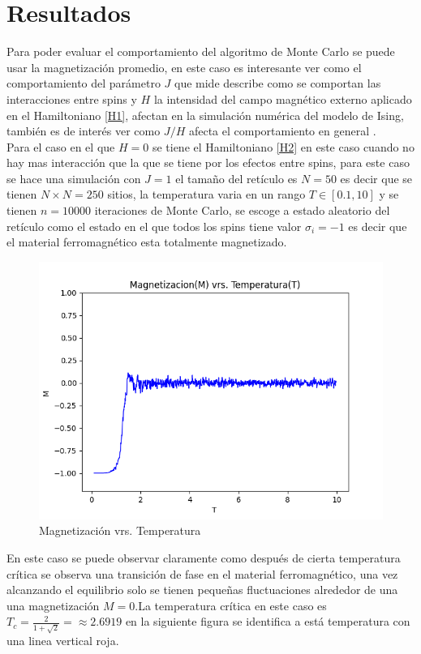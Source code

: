\documentclass[a4paper]{article}
\begin{document}
\section{Resultados}
Para poder evaluar el comportamiento del algoritmo de Monte Carlo se puede usar la magnetización promedio, en este caso es interesante ver como el comportamiento del parámetro $J$ que mide describe como se comportan las interacciones entre spins y $H$ la intensidad del campo magnético externo aplicado en el Hamiltoniano \ref{H1}, afectan en la simulación numérica del modelo de Ising, también es de interés ver como $J/H$ afecta el comportamiento en general .\\
Para el caso en el que $H=0$ se tiene el Hamiltoniano \ref{H2} en este caso cuando no hay mas interacción que la que se tiene por los efectos entre spins, para este caso se hace una simulación con $J=1$ el tamaño del retículo es $N=50$ es decir que se tienen $N\times N=250$ sitios, la temperatura varia en un rango $T\in[0.1,10]$ y se tienen $n=10000$ iteraciones de Monte Carlo, se escoge a estado aleatorio del retículo como el estado en el que todos los spins tiene valor $\sigma_i=-1$ es decir que el material ferromagnético esta totalmente magnetizado.
\begin{figure}[H]
\begin{center}
\includegraphics[scale=0.6]{PlotMvT_sim1.png} 
\end{center} 
\caption{Magnetización vrs. Temperatura}
\end{figure}
En este caso se puede observar claramente como después de cierta temperatura crítica se observa una transición de fase en el material ferromagnético, una vez alcanzando el equilibrio solo se tienen pequeñas fluctuaciones alrededor de una una magnetización $M=0$.La temperatura crítica en este caso es $T_c=\frac{2}{1+\sqrt{2}}=\approx 2.6919$ en la siguiente figura se identifica a está temperatura con una linea vertical roja.
\end{document}
